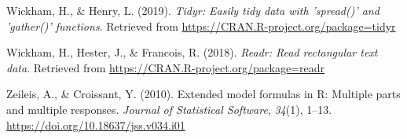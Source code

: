 \documentclass[man]{apa6}
\begin{document}
\leavevmode\hypertarget{ref-R-tidyr}{}%
Wickham, H., \& Henry, L. (2019). \emph{Tidyr: Easily tidy data with 'spread()' and 'gather()' functions}. Retrieved from \url{https://CRAN.R-project.org/package=tidyr}

\leavevmode\hypertarget{ref-R-readr}{}%
Wickham, H., Hester, J., \& Francois, R. (2018). \emph{Readr: Read rectangular text data}. Retrieved from \url{https://CRAN.R-project.org/package=readr}

\leavevmode\hypertarget{ref-R-Formula}{}%
Zeileis, A., \& Croissant, Y. (2010). Extended model formulas in R: Multiple parts and multiple responses. \emph{Journal of Statistical Software}, \emph{34}(1), 1--13. \url{https://doi.org/10.18637/jss.v034.i01}

\endgroup
\end{document}

